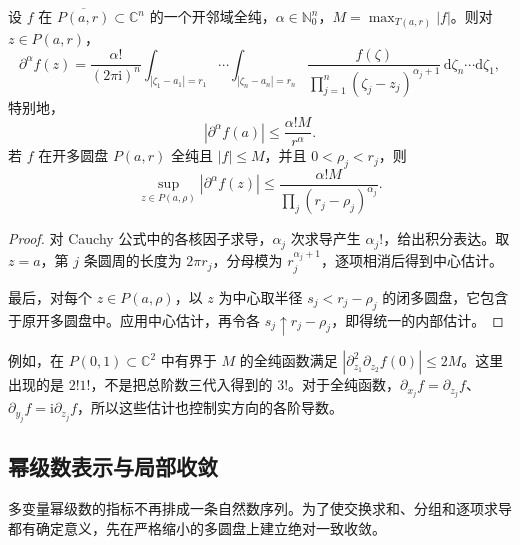 \begin{proposition}\label{b3:prop:29-cauchy-estimates}
设 \(f\) 在 \(\overline{P(a,r)}\subset\mathbb C^n\) 的一个开邻域全纯，\(\alpha\in\mathbb N_0^n\)，\(M=\max_{T(a,r)}|f|\)。则对 \(z\in P(a,r)\)，
\[
 \partial^\alpha f(z)=\frac{\alpha!}{(2\pi\mathrm{i})^n}
 \int_{|\zeta_1-a_1|=r_1}\!\cdots\!
 \int_{|\zeta_n-a_n|=r_n}
 \frac{f(\zeta)}{\prod_{j=1}^n(\zeta_j-z_j)^{\alpha_j+1}}
 \,\mathrm{d}\zeta_n\cdots\mathrm{d}\zeta_1,
\]
特别地，
\[
 |\partial^\alpha f(a)|\le\frac{\alpha!M}{r^\alpha}.
\]
若 \(f\) 在开多圆盘 \(P(a,r)\) 全纯且 \(|f|\le M\)，并且 \(0<\rho_j<r_j\)，则
\[
 \sup_{z\in P(a,\rho)}|\partial^\alpha f(z)|
 \le\frac{\alpha!M}{\prod_j(r_j-\rho_j)^{\alpha_j}}.
\]
\end{proposition}
\begin{proof}
对 Cauchy 公式中的各核因子求导，\(\alpha_j\) 次求导产生 \(\alpha_j!\)，给出积分表达。取 \(z=a\)，第 \(j\) 条圆周的长度为 \(2\pi r_j\)，分母模为 \(r_j^{\alpha_j+1}\)，逐项相消后得到中心估计。

最后，对每个 \(z\in P(a,\rho)\)，以 \(z\) 为中心取半径 \(s_j<r_j-\rho_j\) 的闭多圆盘，它包含于原开多圆盘中。应用中心估计，再令各 \(s_j\uparrow r_j-\rho_j\)，即得统一的内部估计。
\end{proof}

例如，在 \(P(0,1)\subset\mathbb C^2\) 中有界于 \(M\) 的全纯函数满足 \(|\partial_{z_1}^2\partial_{z_2}f(0)|\le2M\)。这里出现的是 \(2!1!\)，不是把总阶数三代入得到的 \(3!\)。对于全纯函数，\(\partial_{x_j}f=\partial_{z_j}f\)、\(\partial_{y_j}f=\mathrm{i}\partial_{z_j}f\)，所以这些估计也控制实方向的各阶导数。

\subsection{幂级数表示与局部收敛}
\label{b3:subsec:290103}

多变量幂级数的指标不再排成一条自然数序列。为了使交换求和、分组和逐项求导都有确定意义，先在严格缩小的多圆盘上建立绝对一致收敛。

